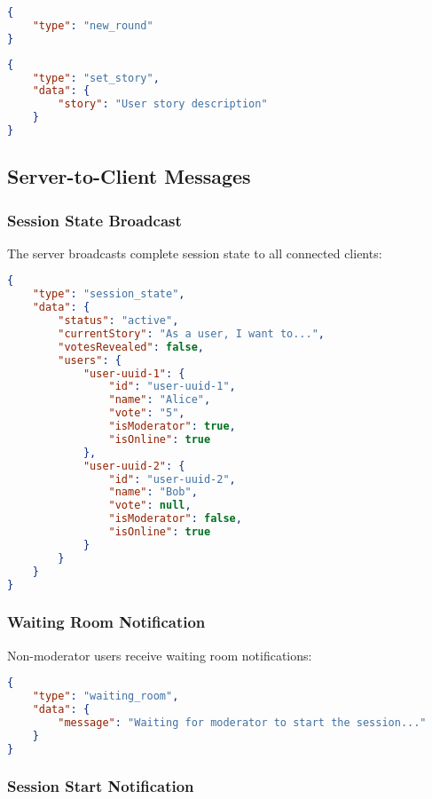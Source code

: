 \documentclass[11pt,a4paper]{article}
\begin{document}
\begin{lstlisting}[language=json, caption=New Round Message]
{
    "type": "new_round"
}
\end{lstlisting}

\begin{lstlisting}[language=json, caption=Set Story Message]
{
    "type": "set_story",
    "data": {
        "story": "User story description"
    }
}
\end{lstlisting}

\subsection{Server-to-Client Messages}

\subsubsection{Session State Broadcast}

The server broadcasts complete session state to all connected clients:

\begin{lstlisting}[language=json, caption=Session State Message]
{
    "type": "session_state",
    "data": {
        "status": "active",
        "currentStory": "As a user, I want to...",
        "votesRevealed": false,
        "users": {
            "user-uuid-1": {
                "id": "user-uuid-1",
                "name": "Alice",
                "vote": "5",
                "isModerator": true,
                "isOnline": true
            },
            "user-uuid-2": {
                "id": "user-uuid-2",
                "name": "Bob",
                "vote": null,
                "isModerator": false,
                "isOnline": true
            }
        }
    }
}
\end{lstlisting}

\subsubsection{Waiting Room Notification}

Non-moderator users receive waiting room notifications:

\begin{lstlisting}[language=json, caption=Waiting Room Message]
{
    "type": "waiting_room",
    "data": {
        "message": "Waiting for moderator to start the session..."
    }
}
\end{lstlisting}

\subsubsection{Session Start Notification}
\end{document}
